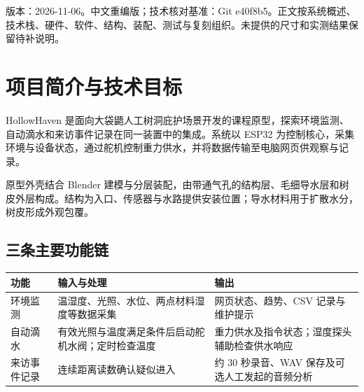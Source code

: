 \documentclass[10pt,a4paper]{article}
\begin{document}
\thispagestyle{empty}
\begingroup
{}
\vspace*{12mm}
\noindent{}\par
\vspace*{64mm}
\noindent{}\par
\vspace{8mm}
\noindent{}\par
\vfill
\noindent{}\par
\vspace*{18mm}
\endgroup
\clearpage
\setcounter{tocdepth}{1}
\renewcommand{\contentsname}{目录}
\begingroup{}\small\tableofcontents\endgroup\clearpage
版本：2026-11-06。中文重编版；技术核对基准：Git e40f8b5。正文按系统概述、技术栈、硬件、软件、结构、装配、测试与复刻组织。未提供的尺寸和实测结果保留待补说明。
\section{项目简介与技术目标}

HollowHaven 是面向大袋鼯人工树洞庇护场景开发的课程原型，探索环境监测、自动滴水和来访事件记录在同一装置中的集成。系统以 ESP32 为控制核心，采集环境与设备状态，通过舵机控制重力供水，并将数据传输至电脑网页供观察与记录。


原型外壳结合 Blender 建模与分层装配，由带通气孔的结构层、毛细导水层和树皮外层构成。结构为入口、传感器与水路提供安装位置；导水材料用于扩散水分，树皮形成外观包覆。


\subsection{三条主要功能链}

\begin{longtable}{p{42mm}p{59mm}p{58mm}}
\toprule
\textbf{功能} & \textbf{输入与处理} & \textbf{输出}\\\midrule\endhead
环境监测 & 温湿度、光照、水位、两点材料湿度等数据采集 & 网页状态、趋势、CSV 记录与维护提示\\
自动滴水 & 有效光照与温度满足条件后启动舵机水阀；定时检查温度 & 重力供水及指令状态；湿度探头辅助检查供水响应\\
来访事件记录 & 连续距离读数确认疑似进入 & 约 30 秒录音、WAV 保存及可选人工发起的音频分析\\
\bottomrule\end{longtable}
\end{document}
